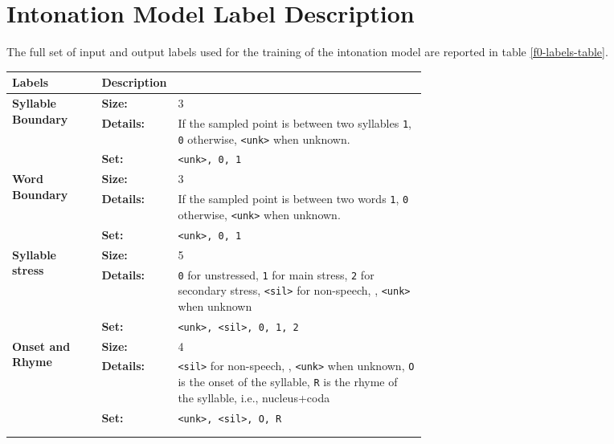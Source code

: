 
\appendix

\chapter{Intonation Model Label Description}\label{chap:appendix-a}

The full set of input and output labels used for the training of the intonation model are reported in table \ref{f0-labels-table}.

\begin{longtable}[c]{llp{0.6\linewidth}}
\toprule

{\bf Labels } & {\bf Description }& {\bf   }\\
\midrule
\multirow{3}{0.18\linewidth}{{\bf Syllable Boundary}}
          & {\bf Size:} 
                                & 3 \\
          & {\bf Details:} 
                                & If the sampled point is between two syllables \verb|1|, \verb|0| otherwise, \verb|<unk>| when unknown. \\
          & {\bf Set:} 
                                & \verb|<unk>, 0, 1| \\ 
          \midrule
          
\multirow{3}{0.18\linewidth}{{\bf Word Boundary}}
          & {\bf Size:} 
                                & 3 \\
          & {\bf Details:} 
                                & If the sampled point is between two words \verb|1|, \verb|0| otherwise, \verb|<unk>| when unknown. \\
          & {\bf Set:} 
                                & \verb|<unk>, 0, 1| \\ 
          \midrule

\multirow{3}{0.18\linewidth}{{\bf Syllable stress}}
          & {\bf Size:} 
                                & 5 \\
          & {\bf Details:} 
                                & \verb|0| for unstressed, \verb|1| for main stress, \verb|2| for secondary stress, \verb|<sil>| for non-speech, , \verb|<unk>| when unknown \\
          & {\bf Set:} 
                                & \verb|<unk>, <sil>, 0, 1, 2| \\ 
          \midrule

\multirow{3}{0.18\linewidth}{{\bf Onset and Rhyme}}
          & {\bf Size:} 
                                & 4 \\
          & {\bf Details:} 
                                & \verb|<sil>| for non-speech, , \verb|<unk>| when unknown, \verb|O| is the onset of the syllable, \verb|R| is the rhyme of the syllable, i.e., nucleus+coda \\
          & {\bf Set:} 
                                & \verb|<unk>, <sil>, O, R| \\ 
          \midrule\\ \\ 


\end{longtable}
